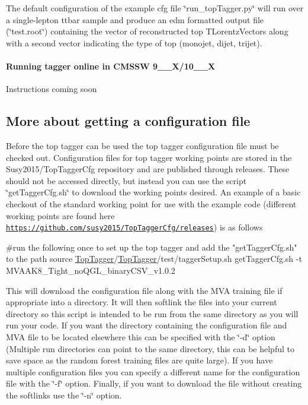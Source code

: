The default configuration of the example cfg file \char`\"{}run\-\_\-top\-Tagger.\-py\char`\"{} will run over a single-\/lepton ttbar sample and produce an edm formatted output file (\char`\"{}test.\-root\char`\"{}) containing the vector of reconstructed top T\-Lorentz\-Vectors along with a second vector indicating the type of top (monojet, dijet, trijet).

\paragraph*{Running tagger online in C\-M\-S\-S\-W 9\-\_\-\_\-\-X/10\-\_\-\_\-\-X}

Instructions coming soon

\subsection*{More about getting a configuration file}

Before the top tagger can be used the top tagger configuration file must be checked out. Configuration files for top tagger working points are stored in the Susy2015/\-Top\-Tagger\-Cfg repository and are published through releases. These should not be accessed directly, but instead you can use the script \char`\"{}get\-Tagger\-Cfg.\-sh\char`\"{} to download the working points desired. An example of a basic checkout of the standard working point for use with the example code (different working points are found here \href{https://github.com/susy2015/TopTaggerCfg/releases}{\tt https\-://github.\-com/susy2015/\-Top\-Tagger\-Cfg/releases}) is as follows


\begin{DoxyCode}
\textcolor{preprocessor}{#run the following once to set up the top tagger and add the "getTaggerCfg.sh" to the path}
\textcolor{preprocessor}{}source \hyperlink{classTopTagger}{TopTagger}/\hyperlink{classTopTagger}{TopTagger}/test/taggerSetup.sh
getTaggerCfg.sh -t MVAAK8\_Tight\_noQGL\_binaryCSV\_v1.0.2
\end{DoxyCode}


This will download the configuration file along with the M\-V\-A training file if appropriate into a directory. It will then softlink the files into your current directory so this script is intended to be run from the same directory as you will run your code. If you want the directory containing the configuration file and M\-V\-A file to be located elsewhere this can be specified with the \char`\"{}-\/d\char`\"{} option (Multiple run directories can point to the same directory, this can be helpful to save space as the random forest training files are quite large). If you have multiple configuration files you can specify a different name for the configuration file with the \char`\"{}-\/f\char`\"{} option. Finally, if you want to download the file without creating the softlinks use the \char`\"{}-\/n\char`\"{} option.

